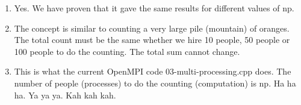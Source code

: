 \begin{enumerate}
	\item Yes. We have proven that it gave the same results for different values of np.
	
	\item The concept is similar to counting a very large pile (mountain) of oranges. The total count must be the same whether we hire 10 people, 50 people or 100 people to do the counting. The total sum cannot change. 
	
	\item This is what the current OpenMPI code 03-multi-processing.cpp does. The number of people (processes) to do the counting (computation) is np. Ha ha ha. Ya ya ya. Kah kah kah.
	
\end{enumerate}


